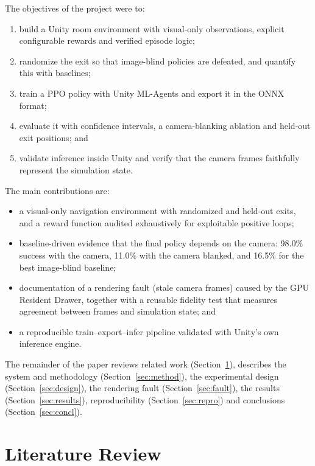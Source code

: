 \documentclass[conference]{IEEEtran}
\begin{document}
The objectives of the project were to:

\begin{enumerate}
\item build a Unity room environment with visual-only observations, explicit configurable rewards and verified episode logic;
\item randomize the exit so that image-blind policies are defeated, and quantify this with baselines;
\item train a PPO policy with Unity ML-Agents and export it in the ONNX format;
\item evaluate it with confidence intervals, a camera-blanking ablation and held-out exit positions; and
\item validate inference inside Unity and verify that the camera frames faithfully represent the simulation state.
\end{enumerate}

The main contributions are:

\begin{itemize}
\item a visual-only navigation environment with randomized and held-out exits, and a reward function audited exhaustively for exploitable positive loops;
\item baseline-driven evidence that the final policy depends on the camera: 98.0\% success with the camera, 11.0\% with the camera blanked, and 16.5\% for the best image-blind baseline;
\item documentation of a rendering fault (stale camera frames) caused by the GPU Resident Drawer, together with a reusable fidelity test that measures agreement between frames and simulation state; and
\item a reproducible train--export--infer pipeline validated with Unity's own inference engine.
\end{itemize}

The remainder of the paper reviews related work (Section~\ref{sec:lit}), describes the system and methodology (Section~\ref{sec:method}), the experimental design (Section~\ref{sec:design}), the rendering fault (Section~\ref{sec:fault}), the results (Section~\ref{sec:results}), reproducibility (Section~\ref{sec:repro}) and conclusions (Section~\ref{sec:concl}).


\section{Literature Review}\label{sec:lit}
\end{document}
